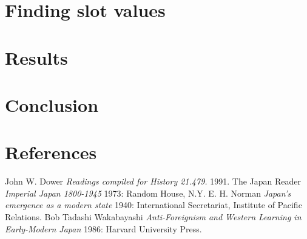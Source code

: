 \documentclass[11pt]{article}
\begin{document}
\section{Finding slot values}

\section{Results}

\section{Conclusion}

\section{References}
\begin{thebibliography}{1}
 John W. Dower {\em Readings compiled for History
  21.479.}  1991.
  The Japan Reader {\em Imperial Japan 1800-1945} 1973:
  Random House, N.Y.
 E. H. Norman {\em Japan's emergence as a modern
  state} 1940: International Secretariat, Institute of Pacific
  Relations.
 Bob Tadashi Wakabayashi {\em Anti-Foreignism and Western
  Learning in Early-Modern Japan} 1986: Harvard University Press.
\end{thebibliography}
\end{document}
